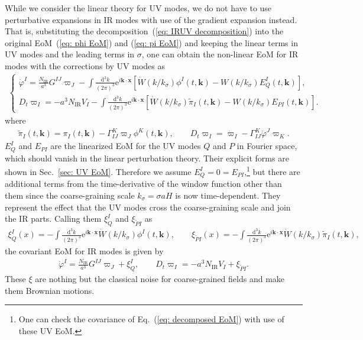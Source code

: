 \documentclass[a4paper,11pt]{article}
\newcommand{\dd}{\mathrm{d}}
\newcommand{\ee}{\mathrm{e}}
\newcommand{\IR}{\text{IR}}
\newcommand{\dk}{\frac{\dd^3k}{(2\pi)^3}}
\newcommand{\dps}{\displaystyle}
\newcommand{\kdx}{\mathbf{k}\cdot\mathbf{x}}
\newcommand{\bae}[1]{\begin{align} #1 \end{align}}
\newcommand{\bce}[1]{\begin{cases} #1 \end{cases}}
\begin{document}
While we consider the linear theory for UV modes, we do not have to use perturbative expansions in IR modes with use of the gradient expansion instead.
That is, substituting the decomposition~(\ref{eq: IRUV decomposition}) into the original EoM~(\ref{eq: phi EoM}) and (\ref{eq: pi EoM}) 
and keeping the linear terms in UV modes and the leading terms in $\sigma$, 
one can obtain the non-linear EoM for IR modes with the corrections by UV modes as
\bae{\label{eq: decomposed EoM}
	\bce{
		\dps
		\dot{\varphi}^I=\frac{N_\IR}{a^3}G^{IJ}\varpi_J-\int\dk\ee^{i\kdx}\left[\dot{W}(k/k_\sigma)\phi^I(t,\mathbf{k})
		-W(k/k_\sigma)E_Q^I(t,\mathbf{k})\right], \\[10pt]
		\dps
		D_t\varpi_I=-a^3N_\IR V_I-\int\dk\ee^{i\kdx}\left[\dot{W}(k/k_\sigma)\tilde{\pi}_I(t,\mathbf{k})
		-W(k/k_\sigma)E_{PI}(t,\mathbf{k})\right].
	}
}
where 
\bae{
	\tilde{\pi}_I(t,\mathbf{k})=\pi_I(t,\mathbf{k})-\Gamma_{IJ}^K\varpi_J\phi^K(t,\mathbf{k}), \quad\quad
	D_t\varpi_I=\dot{\varpi}_I-\Gamma_{IJ}^K\dot{\varphi}^J\varpi_K.
}
$E_Q^I$ and $E_{PI}$ are the linearized EoM for the UV modes $Q$ and $P$ in Fourier space, which should vanish in the linear perturbation theory.
Their explicit forms are shown in Sec.~\ref{sec: UV EoM}. 
Therefore we assume $E_Q^I=0=E_{PI}$,\footnote{One can check the covariance of Eq.~(\ref{eq: decomposed EoM})
with use of these UV EoM.} 
but there are additional terms from the time-derivative of the window function other than them
since the coarse-graining scale $k_\sigma=\sigma aH$ is now time-dependent.
They represent the effect that the UV modes cross the coarse-graining scale and join the IR parts.
Calling them $\xi_Q^I$ and $\xi_{\tilde{P}I}$ as
\bae{
	\xi_Q^I(x)=-\int\dk\ee^{i\kdx}\dot{W}(k/k_\sigma)\phi^I(t,\mathbf{k}), \quad\quad 
	\xi_{\tilde{P}I}(x)=-\int\dk\ee^{i\kdx}\dot{W}(k/k_\sigma)\tilde{\pi}_I(t,\mathbf{k}),
}
the covariant EoM for IR modes is given by
\bae{\label{eq: Langevin in heuristic}
	\dot{\varphi}^I=\frac{N_\IR}{a^3}G^{IJ}\varpi_J+\xi_Q^{I}, \quad\quad
	D_t\varpi_I=-a^3N_\IR V_I+\xi_{\tilde{P}I}.
}
These $\xi$ are nothing but the classical noise for coarse-grained fields and make them Brownian motions.
\end{document}
